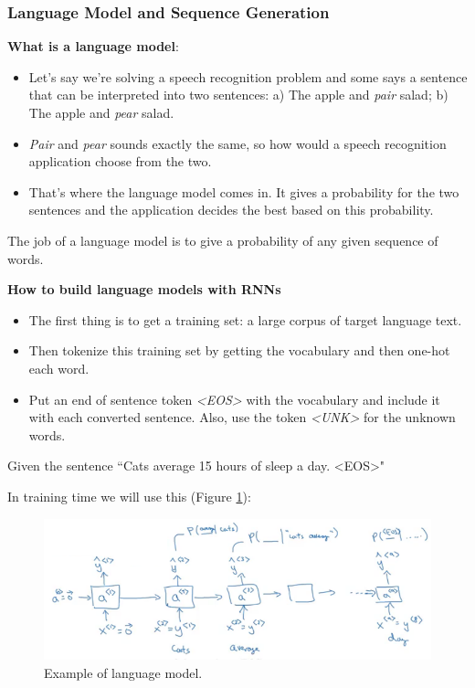 \subsubsection{Language Model and Sequence Generation}
\textbf{What is a language model}:
\begin{itemize}
    \item Let's say we're solving a speech recognition problem and some says a sentence that can be interpreted into two sentences: a) The apple and \textit{pair} salad; b) The apple and \textit{pear} salad.
    \item \textit{Pair} and \textit{pear} sounds exactly the same, so how would a speech recognition application choose from the two.
    \item That's where the language model comes in. It gives a probability for the two sentences and the application decides the best based on this probability.
\end{itemize}

The job of a language model is to give a probability of any given sequence of words.

\textbf{How to build language models with RNNs}
\begin{itemize}
    \item The first thing is to get a training set: a large corpus of target language text.
    \item Then tokenize this training set by getting the vocabulary and then one-hot each word.
    \item Put an end of sentence token \textit{<EOS>} with the vocabulary and include it with each converted sentence. Also, use the token \textit{<UNK>} for the unknown words.
\end{itemize}

Given the sentence ``Cats average 15 hours of sleep a day. <EOS>"

In training time we will use this (Figure \ref{language-model}):

\begin{figure}[!htbp]
    \centering
    \includegraphics[width=1.0\textwidth]{img/c5/language-model.png}
    \caption{Example of language model.}
    \label{language-model}
\end{figure}

